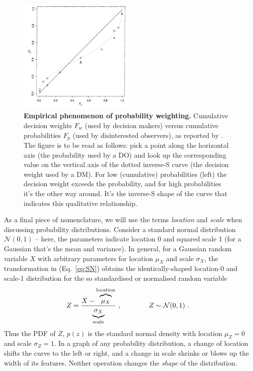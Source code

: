 \documentclass[a4paper, 12pt]{article}
\newcommand{\elabel}[1]{\label{eq:#1}}
\newcommand{\eref}[1]{(Eq.~\ref{eq:#1})}
\newcommand{\flabel}[1]{\label{fig:#1}}
\newcommand{\be}{\begin{equation}}
\newcommand{\ee}{\end{equation}}
\newcommand{\ND}{\mathcal{N}} %
\begin{document}
\begin{figure}[!htb]
\centering
\includegraphics[width=0.5\textwidth]{./figs/TK1992.PNG}
\caption{{\bf Empirical phenomenon of probability weighting.} Cumulative decision weights $F_w$ (used by decision makers) versus cumulative probabilities $F_p$ (used by disinterested observers), as reported by \cite[p. 310, Fig. 1]{TverskyKahneman1992}. The figure is to be read as follows: pick a point along the horizontal axis (the probability used by a DO) and look up the corresponding value on the vertical axis of the dotted inverse-S curve (the decision weight used by a DM). For low (cumulative) probabilities (left) the decision weight exceeds the probability, and for high probabilities it's the other way around. It's the inverse-S shape of the curve that indicates this qualitative relationship.}
\flabel{TK1992}
\end{figure}

As a final piece of nomenclature, we will use the terms \textit{location} and \textit{scale} when discussing probability distributions. Consider a standard normal distribution $\ND(0,1)$ -- here, the parameters indicate location 0 and squared scale 1 (for a Gaussian that's the mean and variance). In general, for a Gaussian random variable $X$ with arbitrary  parameters for location $\mu_X$ and scale $\sigma_X$, the transformation in \eref{SN} obtains the identically-shaped location-0 and scale-1 distribution for the so standardised or normalised random variable
\be \elabel{SN}
	Z = \frac{X-\overbrace{\mu_X \mathstrut}^{\text{location}}}{\underbrace{\sigma_X\mathstrut}_{\text{scale}}}	~, \qquad \qquad Z \sim \ND(0,1)	~.
\ee
Thus the PDF of $Z$, $p(z)$ is the standard normal density with location $\mu_Z=0$ and scale $\sigma_Z=1$. In a graph of any probability distribution, a change of location shifts the curve to the left or right, and a change in scale shrinks or blows up the width of its features. Neither operation changes the {\it shape} of the distribution.
\end{document}
